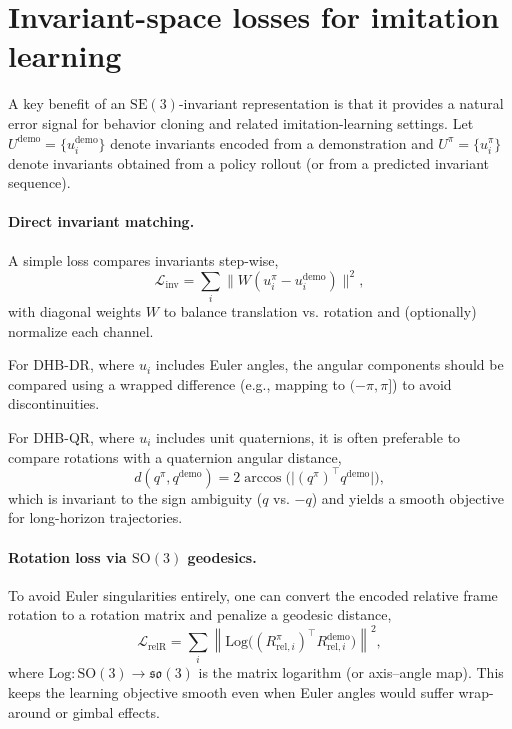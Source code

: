 \documentclass[11pt]{article}
\begin{document}
\section{Invariant-space losses for imitation learning}\label{sec:il-losses}
A key benefit of an $\mathrm{SE}(3)$-invariant representation is that it provides a natural error signal for behavior cloning and related imitation-learning settings. Let $U^{\mathrm{demo}} = \{u_i^{\mathrm{demo}}\}$ denote invariants encoded from a demonstration and $U^{\pi} = \{u_i^{\pi}\}$ denote invariants obtained from a policy rollout (or from a predicted invariant sequence).

\paragraph{Direct invariant matching.}
A simple loss compares invariants step-wise,
\begin{equation}
  \mathcal{L}_{\mathrm{inv}} = \sum_i \lVert W (u_i^{\pi} - u_i^{\mathrm{demo}})\rVert^2,
\end{equation}
with diagonal weights $W$ to balance translation vs. rotation and (optionally) normalize each channel.

For DHB-DR, where $u_i$ includes Euler angles, the angular components should be compared using a wrapped difference (e.g., mapping to $(-\pi,\pi]$) to avoid discontinuities.

For DHB-QR, where $u_i$ includes unit quaternions, it is often preferable to compare rotations with a quaternion angular distance,
\begin{equation}
  d(q^{\pi},q^{\mathrm{demo}}) = 2\arccos\bigl(\lvert (q^{\pi})^\top q^{\mathrm{demo}} \rvert\bigr),
\end{equation}
which is invariant to the sign ambiguity ($q$ vs. $-q$) and yields a smooth objective for long-horizon trajectories.

\paragraph{Rotation loss via $\mathrm{SO}(3)$ geodesics.}
To avoid Euler singularities entirely, one can convert the encoded relative frame rotation to a rotation matrix and penalize a geodesic distance,
\begin{equation}
  \mathcal{L}_{\mathrm{relR}} = \sum_i \left\lVert \mathrm{Log}\bigl( (R_{\mathrm{rel},i}^{\pi})^\top R_{\mathrm{rel},i}^{\mathrm{demo}}\bigr) \right\rVert^2,
\end{equation}
where $\mathrm{Log}:\mathrm{SO}(3)\to\mathfrak{so}(3)$ is the matrix logarithm (or axis--angle map). This keeps the learning objective smooth even when Euler angles would suffer wrap-around or gimbal effects.
\end{document}
